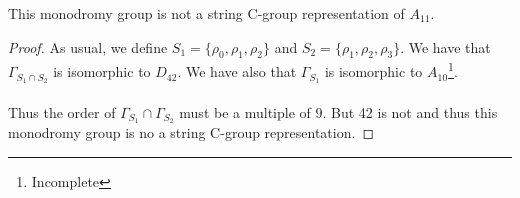\begin{theorem}
  This monodromy group is not a string C-group representation of $A_{11}$.
\end{theorem}

\begin{proof}
  As usual, we define $S_1 = \{\rho_0,\rho_1, \rho_2\}$ and $S_2 = \{\rho_1, \rho_2, \rho_3\}$. We have that $\Gamma_{S_1 \cap S_2}$ is isomorphic to $D_{42}$. We have also that $\Gamma_{S_1}$ is isomorphic to $A_{10}$\footnote{Incomplete}.

  \paragraph{}
  Thus the order of $\Gamma_{S_1} \cap \Gamma_{S_2}$ must be a multiple of $9$. But 42 is not and thus this monodromy group is no a string C-group representation.
\end{proof}
